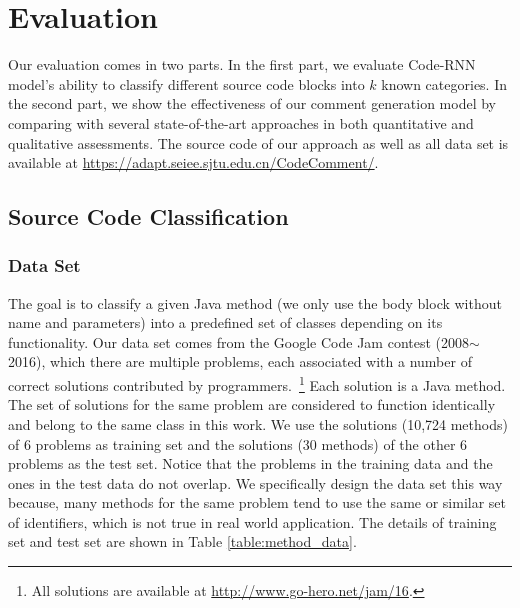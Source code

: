 \section{Evaluation}
Our evaluation comes in two parts. In the first part, we evaluate Code-RNN
model's ability to classify different source code blocks into $k$ known
categories. In the second part, we show the effectiveness of our comment
generation model by comparing with several state-of-the-art approaches in
both quantitative and qualitative assessments. The source code of our
approach as well as all data set is available at \url{https://adapt.seiee.sjtu.edu.cn/CodeComment/}.

\subsection{Source Code Classification}
\subsubsection{Data Set}
The goal is to classify a given Java method (we only use the body block without name and parameters) into a predefined set of
classes depending on its functionality.
Our data set comes from the Google Code Jam contest
(2008$\sim$2016), which there are multiple problems, each associated
with a number of correct solutions contributed by
programmers.~\footnote{All solutions are available at \url{http://www.go-hero.net/jam/16}.} Each solution is a Java method. The set of solutions for
the same problem are considered to function identically and belong
to the same class in this work. We use the solutions (10,724 methods) of
6 problems as training set and the solutions (30 methods) of the other 6
problems as the test set. Notice that the problems in the training data
and the ones in the test data do not overlap. We specifically design the
data set this way because, many methods for the same problem tend to use
the same or similar set of identifiers, which is not true in real world
application.  The details of training set and test set are shown in
Table \ref{table:method_data}.



